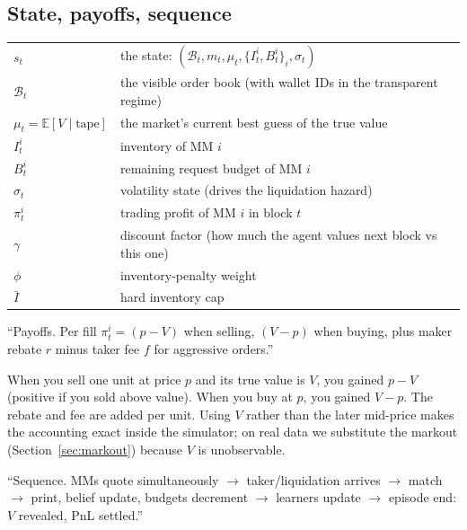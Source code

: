 \documentclass[11pt]{article}
\newcommand{\E}{\mathbb{E}}
\begin{document}
\subsection{State, payoffs, sequence}
\begin{notation}
\begin{tabular}{ll}
$s_t$ & the state: $(\mathcal{B}_t,m_t,\mu_t,\{I^i_t,B^i_t\}_i,\sigma_t)$\\
$\mathcal{B}_t$ & the visible order book (with wallet IDs in the transparent regime)\\
$\mu_t=\E[V\mid\text{tape}]$ & the market's current best guess of the true value\\
$I^i_t$ & inventory of MM $i$\\
$B^i_t$ & remaining request budget of MM $i$\\
$\sigma_t$ & volatility state (drives the liquidation hazard)\\
$\pi^i_t$ & trading profit of MM $i$ in block $t$\\
$\gamma$ & discount factor (how much the agent values next block vs this one)\\
$\phi$ & inventory-penalty weight\\
$\bar I$ & hard inventory cap\\
\end{tabular}
\end{notation}

\begin{deliverable}
``Payoffs. Per fill $\pi^i_t=(p-V)$ when selling, $(V-p)$ when buying, plus maker rebate $r$ minus taker fee $f$ for aggressive orders.''
\end{deliverable}
When you sell one unit at price $p$ and its true value is $V$, you gained $p-V$ (positive if you sold above value). When you buy at $p$, you gained $V-p$. The rebate and fee are added per unit. Using $V$ rather than the later mid-price makes the accounting exact inside the simulator; on real data we substitute the markout (Section~\ref{sec:markout}) because $V$ is unobservable.

\begin{deliverable}
``Sequence. MMs quote simultaneously $\to$ taker/liquidation arrives $\to$ match $\to$ print, belief update, budgets decrement $\to$ learners update $\to$ episode end: $V$ revealed, PnL settled.''
\end{deliverable}
\end{document}
